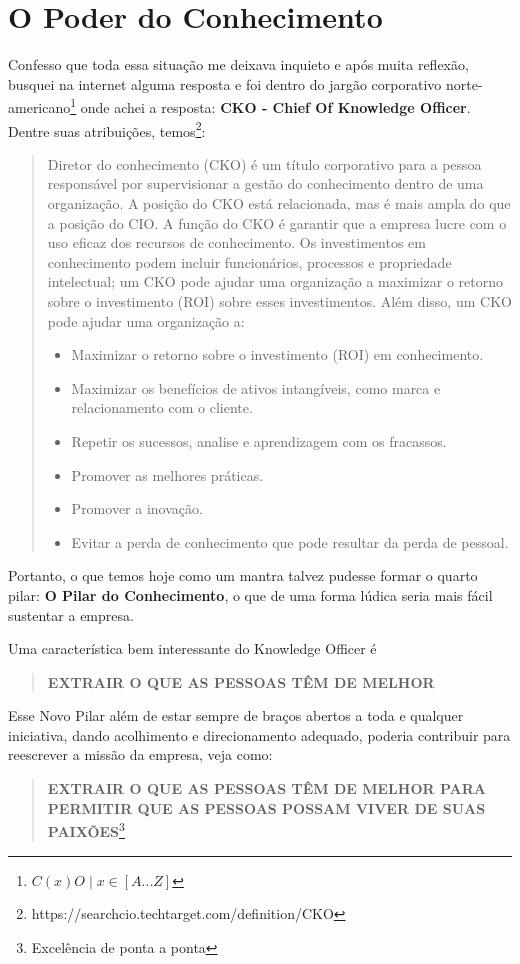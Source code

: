 \section{O Poder do Conhecimento}

Confesso que toda essa situação me deixava inquieto e após muita reflexão, busquei na internet alguma resposta e foi dentro do jargão corporativo norte-americano\footnote{$C(x)O \; | \; x \in [A...Z]$} onde achei a resposta: \textbf{CKO - Chief Of Knowledge Officer}. Dentre suas atribuições, temos\footnote{https://searchcio.techtarget.com/definition/CKO}:
\begin{quotation}
    Diretor do conhecimento (CKO) é um título corporativo para a pessoa responsável por supervisionar a gestão do conhecimento dentro de uma organização. A posição do CKO está relacionada, mas é mais ampla do que a posição do CIO. A função do CKO é garantir que a empresa lucre com o uso eficaz dos recursos de conhecimento. Os investimentos em conhecimento podem incluir funcionários, processos e propriedade intelectual; um CKO pode ajudar uma organização a maximizar o retorno sobre o investimento (ROI) sobre esses investimentos.
    Além disso, um CKO pode ajudar uma organização a:
    \begin{itemize}
        \item Maximizar o retorno sobre o investimento (ROI) em conhecimento.
        \item Maximizar os benefícios de ativos intangíveis, como marca e relacionamento com o cliente.
        \item Repetir os sucessos, analise e aprendizagem com os fracassos.
        \item Promover as melhores práticas.
        \item Promover a inovação.
        \item Evitar a perda de conhecimento que pode resultar da perda de pessoal.
    \end{itemize}
\end{quotation}

Portanto, o que temos hoje como um mantra talvez pudesse formar o quarto pilar: \textbf{O Pilar do Conhecimento}, o que de uma forma lúdica seria mais fácil sustentar a empresa.

Uma característica bem interessante do Knowledge Officer é
\begin{quotation}
    \textbf{EXTRAIR O QUE AS PESSOAS TÊM DE MELHOR}
\end{quotation}
Esse Novo Pilar além de estar sempre de braços abertos a toda e qualquer iniciativa, dando acolhimento e direcionamento adequado, poderia contribuir para reescrever a missão da empresa, veja como:
\begin{quotation}
    \textbf{EXTRAIR O QUE AS PESSOAS TÊM DE MELHOR PARA PERMITIR QUE AS PESSOAS POSSAM VIVER DE SUAS PAIXÕES}\footnote{Excelência de ponta a ponta}
\end{quotation}


